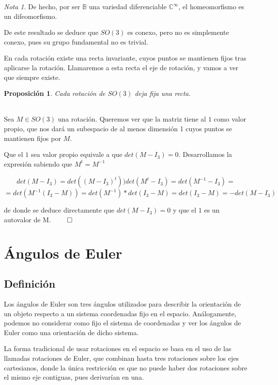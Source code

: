 \documentclass{article}
\theoremstyle{plain}
\newtheorem{proposition}{Proposición}
\theoremstyle{definition}
\theoremstyle{remark}
\newtheorem*{remark}{Nota}
\begin{document}
\begin{remark}
	De hecho, por ser $\mathbb B$ una variedad diferenciable $\mathbb{C^{\infty}}$, el homeomorfismo es un difeomorfismo.
\end{remark}

De este resultado se deduce que $SO(3)$ es conexo, pero no es simplemente conexo, pues su grupo fundamental no es trivial.



En cada rotación existe una recta invariante, cuyos puntos se mantienen fijos tras aplicarse la rotación.
Llamaremos a esta recta el eje de rotación, y vamos a ver que siempre existe.


\begin{proposition}
	Cada rotación de $SO(3)$ deja fija una recta.
\end{proposition}

\begin{proofname}\\
	Sea $ M \in SO(3)$ una rotación. Queremos ver que la matriz tiene al $1$ como valor propio, que nos dará un subespacio
	de al menos dimensión 1 cuyos puntos se mantienen fijos por $M$.

	Que el $1$ sea valor propio equivale a que $ det(M - I_3) = 0$. Desarrollamos la expresión sabiendo que $M^t = M^{-1}$

	\[ det(M - I_3) = det((M - I_3)^t) ) det(M^t - I_3) = det(M^{-1} - I_3) = \]
	\[= det(M^{-1}(I_3 - M)) = det(M^{-1}) * det(I_3 - M) = det(I_3 - M) = -det(M - I_3) \]

	de donde se deduce directamente que $det(M - I_3) = 0$ y que el $1$ es un autovalor de M. $\qed$
\end{proofname}


\section{Ángulos de Euler}
\subsection{Definición}

Los ángulos de Euler son tres ángulos utilizados para describir la orientación de un objeto respecto a un sistema
coordenadas fijo en el espacio. Análogamente, podemos no considerar como fijo el sistema de coordenadas y ver
los ángulos de Euler como una orientación de dicho sistema.

La forma tradicional de usar rotaciones en el espacio se basa en el uso de las llamadas rotaciones de Euler,
que combinan hasta tres rotaciones sobre los ejes cartesianos, donde la única restricción es que no puede
haber dos rotaciones sobre el mismo eje contiguas, pues derivarían en una.
\end{document}
